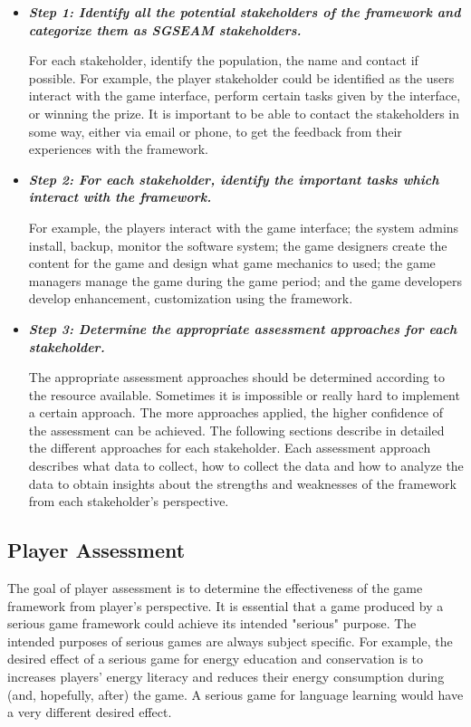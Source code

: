 \documentclass[11pt]{article}
\begin{document}
\begin{itemize}
\item \textbf{\emph{Step 1: Identify all the potential stakeholders of the framework and categorize them as SGSEAM stakeholders.}}

For each stakeholder, identify the population, the name and contact if possible. For example, the 
player stakeholder could be identified as the users interact with the game interface, perform certain tasks given by the interface, or winning the prize. It is important to be able to contact the stakeholders in some way, either via email or phone, to get the feedback from their experiences with the framework.


\item \textbf{\emph{Step 2: For each stakeholder, identify the important tasks which interact with the framework.}}
    
For example, the players interact with the game interface; the system admins install, backup, monitor the software system; the game designers create the content for the game and design what game mechanics to used; the game managers manage the game during the game period; and the game developers develop enhancement, customization using the framework.

\item \textbf{\emph{Step 3: Determine the appropriate assessment approaches for each stakeholder.}}

The appropriate assessment approaches should be determined according to the resource available. Sometimes it is impossible or really hard to implement a certain approach. The more approaches applied, the higher confidence of the assessment can be achieved. The following sections describe in detailed the different approaches for each stakeholder.  Each assessment approach describes what data to collect, how to collect the data and how to analyze the data to obtain insights about the strengths and weaknesses of the framework from each stakeholder's perspective.

\end{itemize}

\subsection{Player Assessment}

The goal of player assessment is to determine the effectiveness of the game
framework from player's perspective. It is essential that a game produced by a serious game
framework could achieve its intended "serious" purpose. The intended purposes of serious games are
always subject specific. For example, the desired effect of a serious game for
energy education and conservation is to increases players' energy literacy and
reduces their energy consumption during (and, hopefully, after) the game. A serious game for
language learning would have a very different desired effect.
\end{document}
